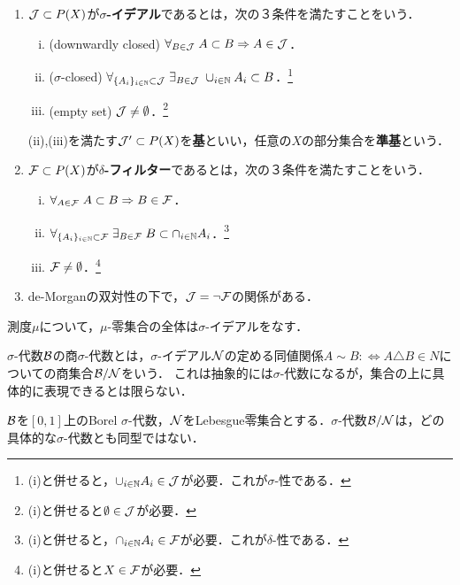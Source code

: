 \documentclass[uplatex, dvipdfmx]{jsreport}
\begin{document}
\begin{definition}\mbox{}
    \begin{enumerate}
        \item $\mathcal{J}\subset P(X)$が\textbf{$\sigma$-イデアル}であるとは，次の３条件を満たすことをいう．
        \begin{enumerate}[(i)]
            \item (downwardly closed) $\forall_{B\in\mathcal{J}}\; A\subset B\Rightarrow A\in\mathcal{J}$．
            \item ($\sigma$-closed) $\forall_{\{A_i\}_{i\in\mathbb{N}}\subset\mathcal{J}}\;\exists_{B\in\mathcal{J}}\;\cup_{i\in\mathbb{N}}A_i\subset B$．\footnote{(i)と併せると，$\cup_{i\in\mathbb{N}}A_i\in\mathcal{J}$が必要．これが$\sigma$-性である．}
            \item (empty set) $\mathcal{J}\ne\emptyset$．\footnote{(i)と併せると$\emptyset\in\mathcal{J}$が必要．}
        \end{enumerate}
        (ii),(iii)を満たす$\mathcal{J}'\subset P(X)$を\textbf{基}といい，任意の$X$の部分集合を\textbf{準基}という．
        \item $\mathcal{F}\subset P(X)$が\textbf{$\delta$-フィルター}であるとは，次の３条件を満たすことをいう．
        \begin{enumerate}[(i)]
            \item $\forall_{A\in\mathcal{F}}\; A\subset B\Rightarrow B\in\mathcal{F}$．
            \item $\forall_{\{A_i\}_{i\in\mathbb{N}}\subset\mathcal{F}}\;\exists_{B\in\mathcal{F}}\;B\subset\cap_{i\in\mathbb{N}}A_i$．\footnote{(i)と併せると，$\cap_{i\in\mathbb{N}}A_i\in\mathcal{F}$が必要．これが$\delta$-性である．}
            \item $\mathcal{F}\ne\emptyset$．\footnote{(i)と併せると$X\in\mathcal{F}$が必要．}
        \end{enumerate}
        \item de-Morganの双対性の下で，$\mathcal{J}=\lnot\mathcal{F}$の関係がある．
    \end{enumerate}
\end{definition}

\begin{example}
    測度$\mu$について，$\mu$-零集合の全体は$\sigma$-イデアルをなす．
\end{example}

\begin{definition}
    $\sigma$-代数$\mathcal{B}$の商$\sigma$-代数とは，$\sigma$-イデアル$\mathcal{N}$の定める同値関係$A\sim B:\Leftrightarrow A\triangle B\in N$についての商集合$\mathcal{B}/\mathcal{N}$をいう．
    これは抽象的には$\sigma$-代数になるが，集合の上に具体的に表現できるとは限らない．
\end{definition}
\begin{example}
    $\mathcal{B}$を$[0,1]$上のBorel $\sigma$-代数，$\mathcal{N}$をLebesgue零集合とする．$\sigma$-代数$\mathcal{B}/\mathcal{N}$は，どの具体的な$\sigma$-代数とも同型ではない．
\end{example}
\end{document}
